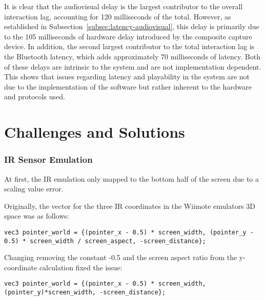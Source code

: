It is clear that the audiovisual delay is the largest contributor to the overall
interaction lag, accounting for 120 milliseconds of the total. However, as
established in Subsection~\ref{subsec:latency-audiovisual}, this delay is
primarily due to the 105 milliseconds of hardware delay introduced by the
composite capture device. In addition, the second largest contributor to the
total interaction lag is the Bluetooth latency, which adds
approximately 70 milliseconds of latency. Both of these delays are intrinsic to the system
and are not implementation dependent. This shows that issues regarding
latency and playability in the system are not due to the implementation of the software but
rather inherent to the hardware and protocols used.

\section{Challenges and Solutions}


\subsubsection{IR Sensor Emulation}
At first, the IR emulation only mapped to the bottom half of the screen due to a scaling value error.

Originally, the vector for the three IR coordinates in the Wiimote emulators 3D space was as follows:
\begin{lstlisting}[style=CStyle, emph={vec3}, emphstyle={\color{magenta}}]
vec3 pointer_world = {(pointer_x - 0.5) * screen_width, (pointer_y - 0.5) * screen_width / screen_aspect, -screen_distance};
\end{lstlisting}

Changing removing the constant -0.5 and the screen aspect ratio from the y-coordinate calculation fixed the issue:
\begin{lstlisting}[style=CStyle, emph={vec3}, emphstyle={\color{magenta}}]
vec3 pointer_world = {(pointer_x - 0.5) * screen_width, (pointer_y)*screen_width, -screen_distance};
\end{lstlisting}

